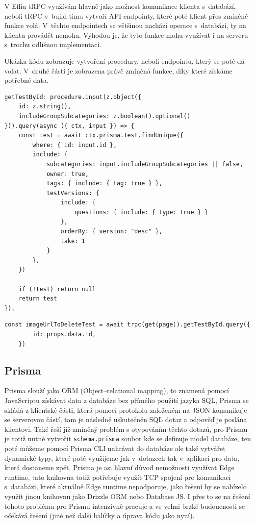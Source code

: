 \documentclass[12pt, a4paper,
openright
]{report}
\begin{document}
V Effiu tRPC využívám hlavně jako možnost komunikace klienta s~databází, neboli tRPC v~build timu vytvoří API endpointy, které poté klient přes zmíněné funkce volá. V~těchto endpointech se většinou nachází operace s~databází, ty na klientu provádět nemohu. Výhodou je, že tyto funkce mohu využívat i na serveru s~trochu odlišnou implementací.

Ukázka kódu zobrazuje vytvoření procedury, neboli endpointu, který se poté dá volat. V~druhé části je zobrazena právě zmíněná funkce, díky které získáme potřebné data.

\begin{lstlisting}[style=ES6, caption=Endpoint generovaný pomocí tRPC, label=trpc_code]
getTestById: procedure.input(z.object({
	id: z.string(),
	includeGroupSubcategories: z.boolean().optional()
})).query(async ({ ctx, input }) => {
	const test = await ctx.prisma.test.findUnique({
		where: { id: input.id },
		include: {
			subcategories: input.includeGroupSubcategories || false,
			owner: true,
			tags: {	include: { tag: true } },
			testVersions: {
				include: {
					questions: { include: { type: true } }
				},
				orderBy: { version: "desc" },
				take: 1
			}
		},
	})
	
	if (!test) return null
	return test
}),
\end{lstlisting}
\clearpage
\begin{lstlisting}[style=ES6, caption=Volání funkce pomocí tRPC klienta s metodou getTestById, label=trpc_code_use]
	const imageUrlToDeleteTest = await trpc(get(page)).getTestById.query({
		id: props.data.id,
	})
\end{lstlisting}
\subsection{Prisma}
Prisma slouží jako ORM (Object–relational mapping), to znamená pomocí JavaScriptu získávat data z databáze bez přímého použití jazyka SQL, Prisma se skládá z klientské části, která pomocí protokolu založeném na JSON komunikuje se serverovou částí, tam je následně uskutečněn SQL dotaz a odpověď je poslána klientovi. Také řeší již zmíněný problém s otypováním těchto dotazů, pro Prismu je totiž nutné vytvořit \texttt{schema.prisma} soubor kde se definuje model databáze, ten poté můžeme pomocí Prisma CLI nahrávat do databáze ale také vytvářet dynamické typy, které poté využijeme jak v~dotazech tak v~aplikaci pro data, která dostaneme zpět.
Prisma je asi hlavní důvod nemožnosti využívat Edge runtime, tato knihovna totiž potřebuje využít TCP spojení pro komunikaci s~databázi, které aktuálně Edge runtime nepodporuje, jako řešení by se nabízelo využít jinou knihovnu jako Drizzle ORM nebo Database JS. I přes to se na řešení tohoto problému pro Prismu intenzivně pracuje a ve velmi brzké budoucnosti se očekává řešení (jiné než další balíčky a úprava kódu jako nyní).
\end{document}
